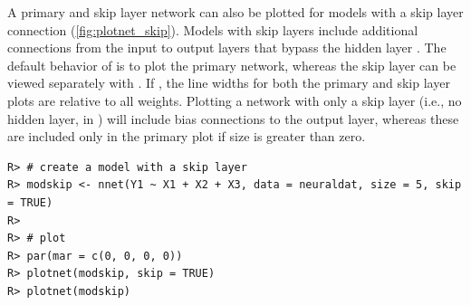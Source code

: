 \documentclass[article,shortnames]{jss}\usepackage[]{graphicx}\usepackage[]{color}
\makeatletter
\newenvironment{kframe}{%
 \def\at@end@of@kframe{}%
 \ifinner\ifhmode%
  \def\at@end@of@kframe{\end{minipage}}%
  \begin{minipage}{\columnwidth}%
 \fi\fi%
 \def\FrameCommand##1{\hskip\@totalleftmargin \hskip-\fboxsep
 \colorbox{shadecolor}{##1}\hskip-\fboxsep
     \hskip-\linewidth \hskip-\@totalleftmargin \hskip\columnwidth}%
 \MakeFramed {\advance\hsize-\width
   \@totalleftmargin\z@ \linewidth\hsize
   \@setminipage}}%
 {\par\unskip\endMakeFramed%
 \at@end@of@kframe}
\newenvironment{knitrout}{}{} %
\makeatother
\begin{document}
A primary and skip layer network can also be plotted for  models with a skip layer connection (\cref{fig:plotnet_skip}). Models with skip layers include additional connections from the input to output layers that bypass the hidden layer \citep{Ripley96}.  The default behavior of  is to plot the primary network, whereas the skip layer can be viewed separately with . If , the line widths for both the primary and skip layer plots are relative to all weights. Plotting a network with only a skip layer (i.e., no hidden layer,  in ) will include bias connections to the output layer, whereas these are included only in the primary plot if size is greater than zero.

\begin{knitrout}
\color{fgcolor}\begin{kframe}
\begin{verbatim}
R> # create a model with a skip layer
R> modskip <- nnet(Y1 ~ X1 + X2 + X3, data = neuraldat, size = 5, skip = TRUE)
R> 
R> # plot
R> par(mar = c(0, 0, 0, 0))
R> plotnet(modskip, skip = TRUE)
R> plotnet(modskip)
\end{verbatim}
\end{kframe}\begin{figure}[!ht]

{\centering {}

}
\end{figure}
\end{knitrout}
\end{document}
